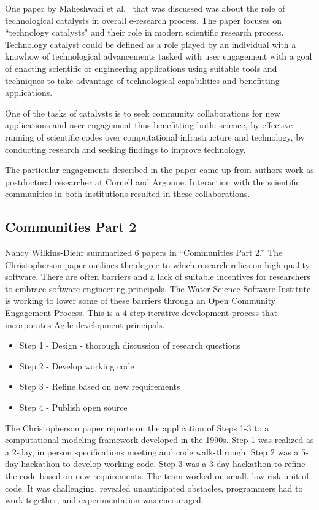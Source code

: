 \documentclass[11pt, oneside]{amsart}
\begin{document}
One paper by Maheshwari et al.~\cite{Maheshwari_WSSSPE} that was
discussed was about the role of technological catalysts in overall e-research
process.  The paper focuses on ``technology catalysts" and their role in modern
scientific research process. Technology catalyst could be defined as a role
played by an individual with a knowhow of technological advancements tasked
with user engagement with a goal of enacting scientific or engineering
applications using suitable tools and techniques to take advantage of
technological capabilities and benefitting applications.

One of the tasks of catalysts is to seek community collaborations for new
applications and user engagement thus benefitting both: science, by effective
running of scientific codes over computational infrastructure and technology,
by conducting research and seeking findings to improve technology.

The particular engagements described in the paper came up from authors work as
postdoctoral researcher at Cornell and Argonne. Interaction with the scientific
communities in both institutions resulted in these collaborations.


\subsection{Communities Part 2}

Nancy Wilkins-Diehr summarized 6 papers in ``Communities Part 2.'' The Christopherson paper outlines the degree to which research
relies on high quality software. There are often barriers and a lack of suitable incentives for researchers to embrace software engineering principals.
The Water Science Software Institute is working to lower some of these barriers through an Open Community Engagement Process.
This is a 4-step iterative development process that incorporates Agile development principals.

\begin{itemize}

\item Step 1 - Design - thorough discussion of research questions
\item Step 2 - Develop working code
\item Step 3 - Refine based on new requirements
\item Step 4 - Publish open source

\end{itemize}

The Christopherson paper reports on the application of Steps 1-3 to a computational modeling framework developed in the 1990s.
Step 1 was realized as a 2-day, in person specifications meeting and code walk-through. Step 2 was a 5-day hackathon to develop working code.
Step 3 was a 3-day hackathon to refine the code based on new requirements. The team worked on small, low-risk unit of
code. It was challenging, revealed unanticipated obstacles, programmers had to work together, and experimentation was encouraged.
\end{document}
